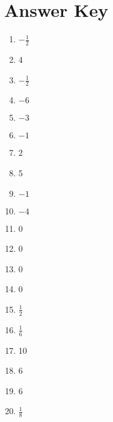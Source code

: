 \newpage

\section{Answer Key}

\begin{enumerate}
	\item $-\frac{1}{2}$
	\item 4
	\item $-\frac{1}{2}$
	\item $-6$
	\item $-3$
	\item $-1$
	\item 2
	\item 5
	
	\item $-1$
	\item $-4$
	\item 0
	\item 0
	\item 0
	\item 0
	\item $\frac{1}{2}$
	\item $\frac{1}{6}$
	\item 10
	\item 6
	\item 6
	\item $\frac{1}{8}$
\end{enumerate}